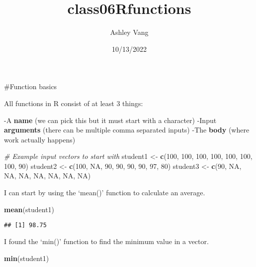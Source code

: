 \documentclass[
]{article}
\title{class06Rfunctions}
\author{Ashley Vang}
\date{10/13/2022}
\newenvironment{Shaded}{\begin{snugshade}}{\end{snugshade}}
\newcommand{\CommentTok}[1]{\textcolor[rgb]{0.56,0.35,0.01}{\textit{#1}}}
\newcommand{\DecValTok}[1]{\textcolor[rgb]{0.00,0.00,0.81}{#1}}
\newcommand{\KeywordTok}[1]{\textcolor[rgb]{0.13,0.29,0.53}{\textbf{#1}}}
\newcommand{\NormalTok}[1]{#1}
\newcommand{\OtherTok}[1]{\textcolor[rgb]{0.56,0.35,0.01}{#1}}
\newcommand{\StringTok}[1]{\textcolor[rgb]{0.31,0.60,0.02}{#1}}
\begin{document}
\maketitle

\#Function basics

All functions in R consist of at least 3 things:

-A \textbf{name} (we can pick this but it must start with a character)
-Input \textbf{arguments} (there can be multiple comma separated inputs)
-The \textbf{body }(where work actually happens)

\begin{Shaded}
\begin{Highlighting}[]
\CommentTok{# Example input vectors to start with}
\NormalTok{student1 <-}\StringTok{ }\KeywordTok{c}\NormalTok{(}\DecValTok{100}\NormalTok{, }\DecValTok{100}\NormalTok{, }\DecValTok{100}\NormalTok{, }\DecValTok{100}\NormalTok{, }\DecValTok{100}\NormalTok{, }\DecValTok{100}\NormalTok{, }\DecValTok{100}\NormalTok{, }\DecValTok{90}\NormalTok{)}
\NormalTok{student2 <-}\StringTok{ }\KeywordTok{c}\NormalTok{(}\DecValTok{100}\NormalTok{, }\OtherTok{NA}\NormalTok{, }\DecValTok{90}\NormalTok{, }\DecValTok{90}\NormalTok{, }\DecValTok{90}\NormalTok{, }\DecValTok{90}\NormalTok{, }\DecValTok{97}\NormalTok{, }\DecValTok{80}\NormalTok{)}
\NormalTok{student3 <-}\StringTok{ }\KeywordTok{c}\NormalTok{(}\DecValTok{90}\NormalTok{, }\OtherTok{NA}\NormalTok{, }\OtherTok{NA}\NormalTok{, }\OtherTok{NA}\NormalTok{, }\OtherTok{NA}\NormalTok{, }\OtherTok{NA}\NormalTok{, }\OtherTok{NA}\NormalTok{, }\OtherTok{NA}\NormalTok{)}
\end{Highlighting}
\end{Shaded}

I can start by using the `mean()' function to calculate an average.

\begin{Shaded}
\begin{Highlighting}[]
\KeywordTok{mean}\NormalTok{(student1)}
\end{Highlighting}
\end{Shaded}

\begin{verbatim}
## [1] 98.75
\end{verbatim}

I found the `min()' function to find the minimum value in a vector.

\begin{Shaded}
\begin{Highlighting}[]
\KeywordTok{min}\NormalTok{(student1)}
\end{Highlighting}
\end{Shaded}
\end{document}
